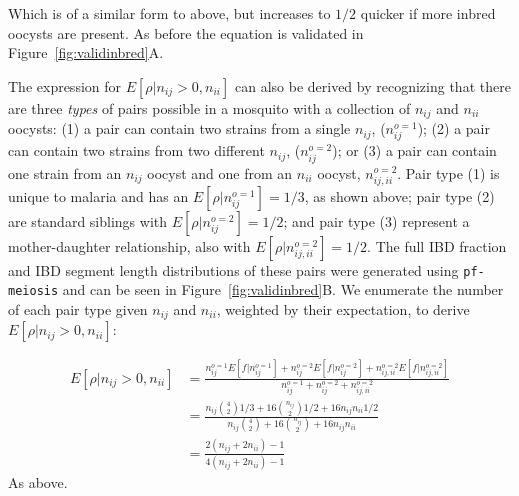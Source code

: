 \documentclass[9pt,lineno]{elife}
\begin{document}
\begin{appendixbox}
Which is of a similar form to above, but increases to $1/2$ quicker if more inbred oocysts are present. As before the equation is validated in Figure~\ref{fig:validinbred}A.



The expression for $E[\rho|n_{ij} > 0, n_{ii}]$ can also be derived by recognizing that there are three \textit{types} of pairs possible in a mosquito with a collection of $n_{ij}$ and $n_{ii}$ oocysts: (1) a pair can contain two strains from a single $n_{ij}$, ($n^{o=1}_{ij}$); (2) a pair can contain two strains from two different $n_{ij}$, ($n^{o=2}_{ij}$); or (3) a pair can contain one strain from an $n_{ij}$ oocyst and one from an $n_{ii}$ oocyst, $n^{o=2}_{ij, ii}$. Pair type (1) is unique to malaria and has an  $E[\rho|n^{o=1}_{ij}]=1/3$, as shown above; pair type (2) are standard siblings with $E[\rho|n^{o=2}_{ij}]=1/2$; and pair type (3) represent a mother-daughter relationship, also with $E[\rho|n^{o=2}_{ij, ii}]=1/2$. The full IBD fraction and IBD segment length distributions of these pairs were generated using \texttt{pf-meiosis} and can be seen in Figure~\ref{fig:validinbred}B. We enumerate the number of each pair type given $n_{ij}$ and $n_{ii}$, weighted by their expectation, to derive $E[\rho|n_{ij} > 0, n_{ii}]$:


\begin{align}
E[\rho|n_{ij} > 0, n_{ii}] & = \frac{n^{o=1}_{ij}E[f|n^{o=1}_{ij}] + n^{o=2}_{ij}E[f|n^{o=2}_{ij}]
+ n^{o=2}_{ij, ii}E[f|n^{o=2}_{ij, ii}]}{n^{o=1}_{ij} + n^{o=2}_{ij} + n^{o=2}_{ij, ii}} \nonumber\\
& = \frac{ n_{ij}{4\choose 2}1/3 + 16{n_{ij}\choose 2}1/2 + 16n_{ij}n_{ii}1/2}{
n_{ij}{4\choose 2} + 16{n_{ij}\choose 2} + 16n_{ij}n_{ii}} \nonumber\\
& = \frac{2(n_{ij} + 2n_{ii}) - 1}{4(n_{ij} + 2n_{ii}) - 1}
\end{align}
As above.

\end{appendixbox}
\end{document}
